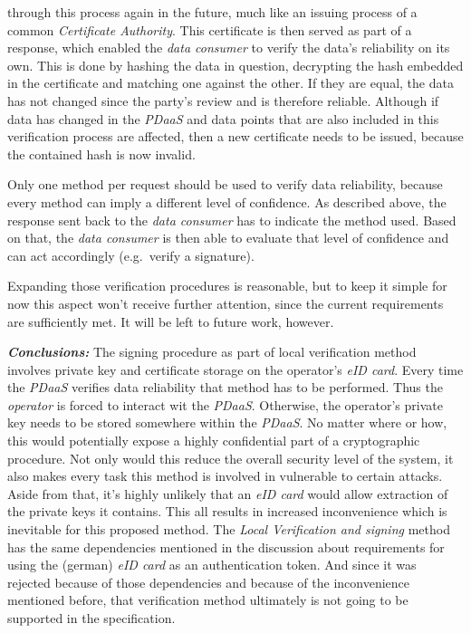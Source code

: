 \documentclass[12pt,english,a4paper,titlepage,cleardoublepage=empty,dottedtoc]{report}
\begin{document}
\begin{enumerate}
  through this process again in the future, much like an issuing process
  of a common \emph{Certificate Authority}. This certificate is then
  served as part of a response, which enabled the \emph{data consumer}
  to verify the data's reliability on its own. This is done by hashing
  the data in question, decrypting the hash embedded in the certificate
  and matching one against the other. If they are equal, the data has
  not changed since the party's review and is therefore reliable.
  Although if data has changed in the \emph{PDaaS} and data points that
  are also included in this verification process are affected, then a
  new certificate needs to be issued, because the contained hash is now
  invalid.
\end{enumerate}

Only one method per request should be used to verify data reliability,
because every method can imply a different level of confidence. As
described above, the response sent back to the \emph{data consumer} has
to indicate the method used. Based on that, the \emph{data consumer} is
then able to evaluate that level of confidence and can act accordingly
(e.g.~verify a signature).

Expanding those verification procedures is reasonable, but to keep it
simple for now this aspect won't receive further attention, since the
current requirements are sufficiently met. It will be left to future
work, however.

\emph{\textbf{Conclusions:}} The signing procedure as part of local
verification method involves private key and certificate storage on the
operator's \emph{eID card}. Every time the \emph{PDaaS} verifies data
reliability that method has to be performed. Thus the \emph{operator} is
forced to interact wit the \emph{PDaaS}. Otherwise, the operator's
private key needs to be stored somewhere within the \emph{PDaaS}. No
matter where or how, this would potentially expose a highly confidential
part of a cryptographic procedure. Not only would this reduce the
overall security level of the system, it also makes every task this
method is involved in vulnerable to certain attacks. Aside from that,
it's highly unlikely that an \emph{eID card} would allow extraction of
the private keys it contains. This all results in increased
inconvenience which is inevitable for this proposed method. The
\emph{Local Verification and signing} method has the same dependencies
mentioned in the discussion about requirements for using the (german)
\emph{eID card} as an authentication token. And since it was rejected
because of those dependencies and because of the inconvenience mentioned
before, that verification method ultimately is not going to be supported
in the specification.
\end{document}
